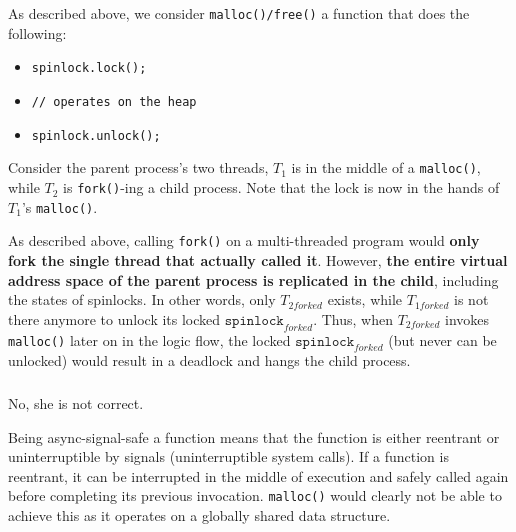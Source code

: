 \documentclass[12pt]{article}
\begin{document}
\newpage
\section{}

\subsection{}

\subsubsection{}

As described above, we consider \texttt{malloc()/free()} a function that does the following:
\begin{itemize}[topsep=0pt]\itemsep-0.6em 
    \item \texttt{spinlock.lock();}
    \item \texttt{// operates on the heap}
    \item \texttt{spinlock.unlock();}
\end{itemize}

Consider the parent process's two threads, $T_1$ is in the middle of a \texttt{malloc()}, while $T_2$ is \texttt{fork()}-ing a child process. Note that the lock is now in the hands of $T_1$'s \texttt{malloc()}. 

As described above, calling \texttt{fork()} on a multi-threaded program would \textbf{only fork the single thread that actually called it}. However, \textbf{the entire virtual address space of the parent process is replicated in the child}, including the states of spinlocks. In other words, only $T_{2forked}$ exists, while $T_{1forked}$ is not there anymore to unlock its locked $\mathtt{spinlock}_{forked}$. Thus, when $T_{2forked}$ invokes \texttt{malloc()} later on in the logic flow, the locked $\mathtt{spinlock}_{forked}$ (but never can be unlocked) would result in a deadlock and hangs the child process.

\subsubsection{}

No, she is not correct.

Being async-signal-safe a function means that the function is either reentrant or uninterruptible by signals (uninterruptible system calls). If a function is reentrant, it can be interrupted in the middle of execution and safely called again before completing its previous invocation. \texttt{malloc()} would clearly not be able to achieve this as it operates on a globally shared data structure.
\end{document}
